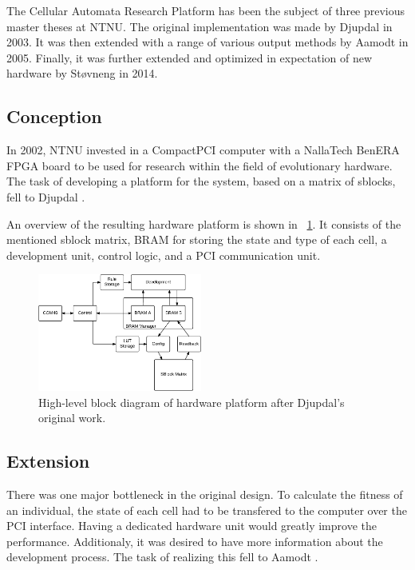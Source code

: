 The Cellular Automata Research Platform has been the subject of three previous master theses at NTNU.
The original implementation was made by Djupdal in 2003.
It was then extended with a range of various output methods by Aamodt in 2005.
Finally, it was further extended and optimized in expectation of new hardware by Støvneng in 2014.

\subsection{Conception}

In 2002, NTNU invested in a CompactPCI computer with a NallaTech BenERA FPGA board to be used for research within the field of evolutionary hardware.
The task of developing a platform for the system, based on a matrix of sblocks, fell to Djupdal \cite{djupdal2003sblock}.

An overview of the resulting hardware platform is shown in \figurename~\ref{fig:overview-djupdal}.
It consists of the mentioned sblock matrix, BRAM for storing the state and type of each cell, a development unit, control logic, and a PCI communication unit.

\begin{figure}[!ht]
    \centering
    \includegraphics[width=0.48\textwidth]{figures/overview-djupdal}
    \caption{High-level block diagram of hardware platform after Djupdal's original work.}
    \label{fig:overview-djupdal}
\end{figure}



\subsection{Extension}

There was one major bottleneck in the original design.
To calculate the fitness of an individual, the state of each cell had to be transfered to the computer over the PCI interface.
Having a dedicated hardware unit would greatly improve the performance.
Additionaly, it was desired to have more information about the development process.
The task of realizing this fell to Aamodt \cite{aamodt2005sblock}.

